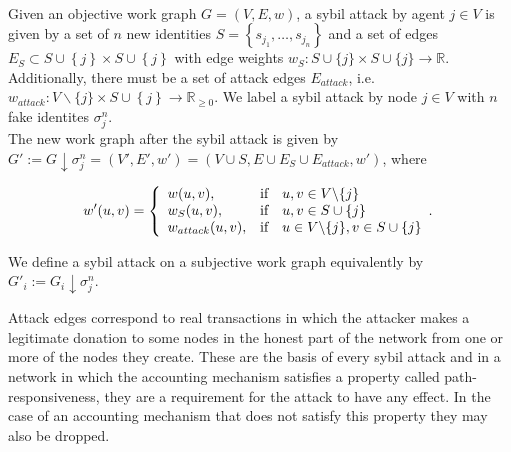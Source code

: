 \begin{definition}\ \\
\label{def:Sybil Attack}
\noindent{}Given an objective work graph $G=(V,E,w)$, a sybil attack by agent $j\in{}V$ is given by a set of $n$ new identities $S=\left\lbrace{}s_{j_1},\ldots{},s_{j_n}\right\rbrace$ and a set of edges $E_S\subset{}S\cup\left\lbrace{}j\right\rbrace\times{}S\cup\left\lbrace{}j\right\rbrace$ with edge weights $w_S:S\cup{}\{j\} \times S\cup{}\{j\}\rightarrow{}\mathbb{R}$. Additionally, there must be a set of attack edges $E_{attack}$, i.e. $w_{attack}:V\backslash\lbrace{}j\rbrace\times{}S\cup\left\lbrace{}j\right\rbrace\rightarrow\mathbb{R}_{\geq{}0}$. We label a sybil attack by node $j\in{}V$ with $n$ fake identites $\sigma^n_j$. \vspace{1em}\\

\noindent{}The new work graph after the sybil attack is given by $G':=G\downarrow\sigma^n_j=(V',E',w')=(V\cup{}S,E\cup{}E_S\cup{}E_{attack},w')$, where 

\[
w'(u,v)=\left\lbrace 
\begin{array}{lll}
w(u,v), & \textrm{if} & u,v\in{}V\backslash{}\lbrace{}j\rbrace \\
w_S(u,v), & \textrm{if} & u,v\in{}S\cup\lbrace{}j\rbrace \\
w_{attack}(u,v), & \textrm{if} & u\in{}V\backslash\lbrace{}j\rbrace, v\in{}S\cup\lbrace{}j\rbrace \\
\end{array} .
\right. \vspace{1em}\\
\]

\noindent{}We define a sybil attack on a subjective work graph equivalently by $G'_i:=G_i\downarrow{}\sigma^n_j$.\vspace{1em}\\
\end{definition}

\noindent{}Attack edges correspond to real transactions in which the attacker makes a legitimate donation to some nodes in the honest part of the network from one or more of the nodes they create. These are the basis of every sybil attack and in a network in which the accounting mechanism satisfies a property called path-responsiveness, they are a requirement for the attack to have any effect. In the case of an accounting mechanism that does not satisfy this property they may also be dropped.\vspace{1em}\\

